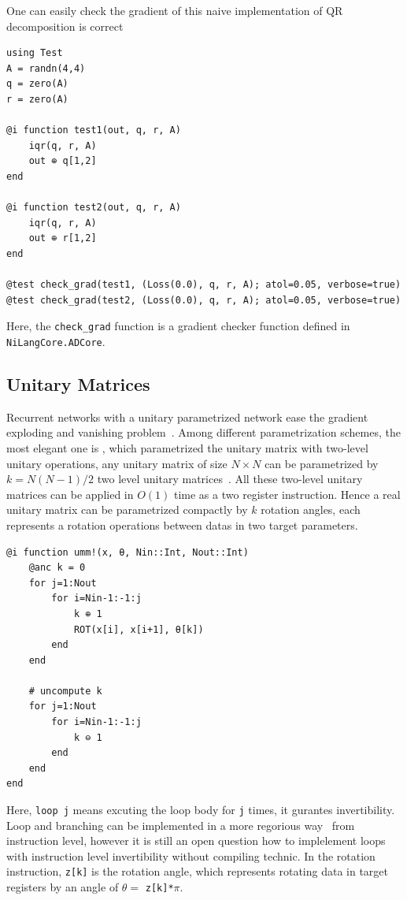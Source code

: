 \documentclass{article}
\newcommand{\<}{\langle}
\renewcommand{\>}{\rangle}
\begin{document}
One can easily check the gradient of this naive implementation of QR decomposition is correct
\begin{minipage}{.44\textwidth}
\begin{lstlisting}
using Test
A = randn(4,4)
q = zero(A)
r = zero(A)

@i function test1(out, q, r, A)
    iqr(q, r, A)
    out ⊕ q[1,2]
end

@i function test2(out, q, r, A)
    iqr(q, r, A)
    out ⊕ r[1,2]
end

@test check_grad(test1, (Loss(0.0), q, r, A); atol=0.05, verbose=true)
@test check_grad(test2, (Loss(0.0), q, r, A); atol=0.05, verbose=true)
\end{lstlisting}
\end{minipage}

Here, the \texttt{check\_grad} function is a gradient checker function defined in \texttt{NiLangCore.ADCore}.

\subsection{Unitary Matrices}
Recurrent networks with a unitary parametrized network ease the gradient exploding and vanishing problem~\cite{Arjovsky2015,Wisdom2016,Li2016}.
Among different parametrization schemes, the most elegant one is \cite{Li2016}, which parametrized the unitary matrix with two-level unitary operations, any unitary matrix of size $N\times N$ can be parametrized by $k = N(N-1)/2$ two level unitary matrices~\cite{Li2013}. All these two-level unitary matrices can be applied in $O(1)$ time as a two register instruction.
Hence a real unitary matrix can be parametrized compactly by $k$ rotation angles, each represents a rotation operations between datas in two target parameters.


\begin{minipage}{.44\textwidth}
\begin{lstlisting}[basicstyle=\small\ttfamily,columns=fullflexible]
@i function umm!(x, θ, Nin::Int, Nout::Int)
    @anc k = 0
    for j=1:Nout
        for i=Nin-1:-1:j
            k ⊕ 1
            ROT(x[i], x[i+1], θ[k])
        end
    end

    # uncompute k
    for j=1:Nout
        for i=Nin-1:-1:j
            k ⊖ 1
        end
    end
end
\end{lstlisting}
\end{minipage}

Here, \texttt{loop j} means excuting the loop body for \texttt{j} times, it gurantes invertibility.
Loop and branching can be implemented in a more regorious way~\cite{Vieri1999} from instruction level,
however it is still an open question how to implelement loops with instruction level invertibility without compiling technic.
In the rotation instruction, \texttt{z[k]} is the rotation angle, which represents rotating data in target registers by an angle of $\theta=$ \texttt{z[k]*$\pi$}.
\end{document}
